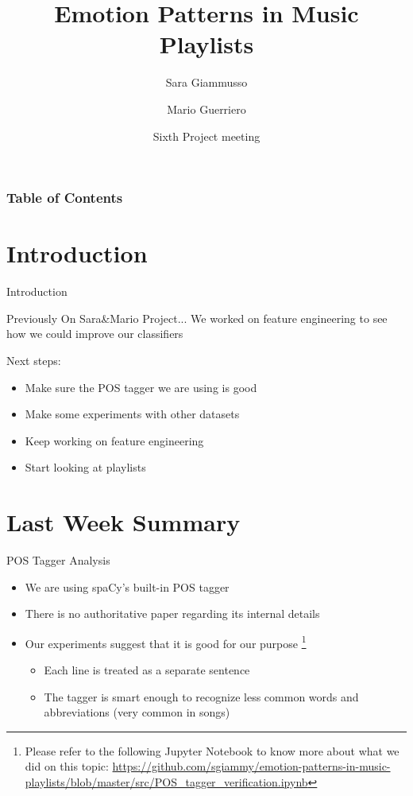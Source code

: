 \documentclass[xcolor=dvipsnames]{beamer}
\title[Emotion Patterns in Music Playlists] %
{Emotion Patterns in Music Playlists}
\author[Sara, Mario] %
{Sara Giammusso\inst{1}\inst{2} \and Mario Guerriero \inst{1}\inst{2}}
\institute[EURECOM] %
{
 \inst{1}
 MSc student in Data Science Department, EURECOM, T\'el\'ecom ParisTech, France\\
  \inst{2}%
 MSc student in Department of Control and Computer Engineering, Politecnico di Torino, Italy
}
\date[2018 May 3] %
{Sixth Project meeting}
\begin{document}
\frame{\titlepage}

\begin{frame}
\frametitle{Table of Contents}
\tableofcontents
\end{frame}

\section{Introduction}
\begin{frame}{Introduction}
\begin{block}{Previously On Sara\&Mario Project...}
We worked on feature engineering to see how we could improve our classifiers\\
\end{block}
Next steps:
\begin{itemize}
\item Make sure the POS tagger we are using is good
\item Make some experiments with other datasets
\item Keep working on feature engineering
\item Start looking at playlists
\end{itemize}
\end{frame}

\section{Last Week Summary}

\begin{frame}{POS Tagger Analysis}
\begin{itemize}
\item We are using spaCy's built-in POS tagger
\item There is no authoritative paper regarding its internal details
\item Our experiments suggest that it is good for our purpose
	\footnote{Please refer to the following Jupyter Notebook to know more about what we did on this topic: \url{https://github.com/sgiammy/emotion-patterns-in-music-playlists/blob/master/src/POS_tagger_verification.ipynb}}
	\begin{itemize}
	\item Each line is treated as a separate sentence
	\item The tagger is smart enough to recognize less common words and abbreviations (very common in songs)
	\end{itemize}
\end{itemize}
\end{frame}
\end{document}
